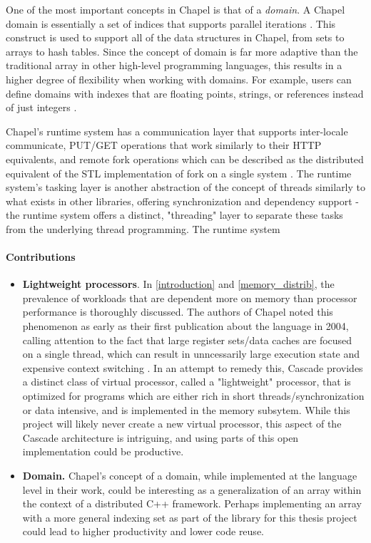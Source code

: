	One of the most important concepts in Chapel is that of a \textit{domain}. A Chapel domain is essentially a set of indices that supports parallel iterations \cite{chapel_2007}. This construct is used to support all of the data structures in Chapel, from sets to arrays to hash tables. Since the concept of domain is far more adaptive than the traditional array in other high-level programming languages, this results in a higher degree of flexibility when working with domains. For example, users can define domains with indexes that are floating points, strings, or references instead of just integers \cite{chapel_2007}. 

	Chapel's runtime system has a communication layer that supports inter-locale communicate, PUT/GET operations that work similarly to their HTTP equivalents, and remote fork operations which can be described as the distributed equivalent of the STL implementation of fork on a single system \cite{chapel_rts_ppt}. The runtime system's tasking layer is another abstraction of the concept of threads similarly to what exists in other libraries, offering synchronization and dependency support - the runtime system offers a distinct, "threading" layer to separate these tasks from the underlying thread programming.  The runtime system 
	\paragraph{Contributions}
	\begin{itemize}
		\item \textbf{Lightweight processors}. In \ref{introduction} and \ref{memory_distrib}, the prevalence of workloads that are dependent more on memory than processor performance is thoroughly discussed. The authors of Chapel noted this phenomenon as early as their first publication about the language in 2004, calling attention to the fact that large register sets/data caches are focused on a single thread, which can result in unncessarily large execution state and expensive context switching \cite{chapel}. In an attempt to remedy this, Cascade provides a distinct class of virtual processor, called a "lightweight" processor, that is optimized for programs which are either rich in short threads/synchronization or data intensive, and is implemented in the memory subsytem. While this project will likely never create a new virtual processor, this aspect of the Cascade architecture is intriguing, and using parts of this open implementation could be productive. 


		\item \textbf{Domain.} Chapel's concept of a domain, while implemented at the language level in their work, could be interesting as a generalization of an array within the context of a distributed C++ framework. Perhaps implementing an array with a more general indexing set as part of the library for this thesis project could lead to higher productivity and lower code reuse. 

	\end{itemize}

